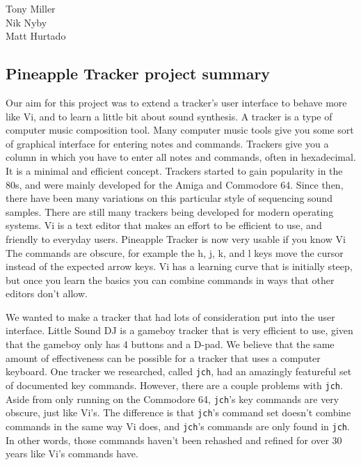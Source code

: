 \documentclass[12pt,letterpaper]{article}
\begin{document}
\begin{flushright}
Tony Miller\\
Nik Nyby\\
Matt Hurtado
\end{flushright}

\begin{center}
\section*{Pineapple Tracker project summary}
\end{center}


\doublespacing

\par
Our aim for this project was to extend a tracker's user interface to behave more like Vi, and to learn a little bit about sound synthesis.
A tracker is a type of computer music composition tool.
Many computer music tools give you some sort of graphical interface for entering notes and commands.
Trackers give you a column in which you have to enter all notes and commands, often in hexadecimal.
It is a minimal and efficient concept.
Trackers started to gain popularity in the 80s, and were mainly developed for the Amiga and Commodore 64.
Since then, there have been many variations on this particular style of sequencing sound samples.
There are still many trackers being developed for modern operating systems.
Vi is a text editor that makes an effort to be efficient to use, and friendly to everyday users.
Pineapple Tracker is now very usable if you know Vi
The commands are obscure, for example the h, j, k, and l keys move the cursor instead of the expected arrow keys.
Vi has a learning curve that is initially steep, but once you learn the basics you can combine commands in ways that other editors don't allow.

\par
We wanted to make a tracker that had lots of consideration put into the user interface.
Little Sound DJ is a gameboy tracker that is very efficient to use, given that the gameboy only has 4 buttons and a D-pad.
We believe that the same amount of effectiveness can be possible for a tracker that uses a computer keyboard.
One tracker we researched, called {\tt jch}, had an amazingly featureful set of documented key commands.
However, there are a couple problems with {\tt jch}.
Aside from only running on the Commodore 64, {\tt jch}'s key commands are very obscure, just like Vi's.
The difference is that {\tt jch}'s command set doesn't combine commands in the same way Vi does, and {\tt jch}'s commands are only found in {\tt jch}.
In other words, those commands haven't been rehashed and refined for over 30 years like Vi's commands have.
\end{document}
